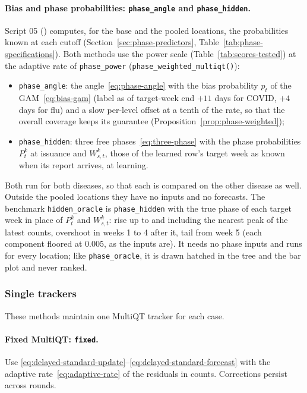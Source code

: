 \documentclass[11pt,a4paper]{article}
\theoremstyle{definition}
\theoremstyle{remark}
\begin{document}
\paragraph{Bias and phase probabilities: \texttt{phase\_angle} and
\texttt{phase\_hidden}.} Script 05 () computes,
for the base and the pooled locations, the probabilities known at each
cutoff (Section~\ref{sec:phase-predictors}, Table~\ref{tab:phase-specifications}).
Both methods use the power scale (Table~\ref{tab:scores-tested}) at the adaptive
rate of \texttt{phase\_power} (\texttt{phase\_weighted\_multiqt()}):
\begin{itemize}[leftmargin=*,itemsep=1pt]
\item \texttt{phase\_angle}: the angle~\eqref{eq:phase-angle} with the bias
probability $p_t$ of the GAM~\eqref{eq:bias-gam} (label as of target-week end
$+11$ days for COVID, $+4$ days for flu) and a slow per-level offset at a tenth
of the rate, so that the overall coverage keeps its guarantee
(Proposition~\ref{prop:phase-weighted});
\item \texttt{phase\_hidden}: three free phases~\eqref{eq:three-phase} with
the phase probabilities $P_t^k$ at issuance and $W_{s,t}^k$, those of the
learned row's target week as known when its report arrives, at learning.
\end{itemize}
Both run for both diseases, so that each is compared on the other disease
as well. Outside the pooled locations they have no inputs and no
forecasts. The benchmark \texttt{hidden\_oracle} is \texttt{phase\_hidden}
with the true phase of each target week in place of $P_t^k$ and
$W_{s,t}^k$: rise up to and including the nearest peak of the latest
counts, overshoot in weeks 1 to 4 after it, tail from week 5 (each
component floored at $0.005$, as the inputs are). It needs no phase inputs
and runs for every location; like \texttt{phase\_oracle}, it is drawn
hatched in the tree and the bar plot and never ranked.

\subsubsection{Single trackers}
\label{sec:single-trackers}
These methods maintain one MultiQT tracker for each case.

\paragraph{Fixed MultiQT: \texttt{fixed}.}
Use \eqref{eq:delayed-standard-update}--\eqref{eq:delayed-standard-forecast}
with the adaptive rate~\eqref{eq:adaptive-rate} of the residuals in counts.
Corrections persist across rounds.
\end{document}
